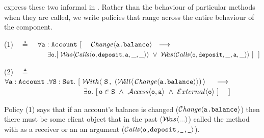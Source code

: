  express these two informal  %
in \Chainmail.  Rather than %
 the behaviour of particular methods when they are called, we
write policies 
{}  that range across the entire behaviour of the
component.
\vspace{.2cm}


(1)\ \  $\triangleq$\ \ $\forall \prg{a}:\prg{Account}\ [\ \ \ \  \Changes{\prg{a.balance}}  \ \    
    \longrightarrow \ \    \hfill$ \\
  $\strut \hspace{2.3cm} 
 \exists \prg{o}. [\  \Past{\Calls{\prg{o},\prg{deposit},\prg{a},\_,\_}}\ \vee\  \Past{\Calls{\prg{o},\prg{deposit},\_,\prg{a},\_}} \ ] \ \ ] \hfill $

\vspace{.4cm}

    (2)\ \  $\triangleq$\ \ $\forall \prg{a}:\prg{Account}\ .\forall \prg{S}:\prg{Set}.\ [  \ \Using{(\Future{\,\Changes{\prg{a.balance}}})\,}{\prg{S}\,}\ \ \   \
    \longrightarrow$ \\
 $\strut \hspace{3.9cm} \hfill \exists \prg{o}.\ [\, \prg{o}\in \prg{S}\ \wedge \ \CanAccess{\prg{o}}{\prg{a}}\ \wedge  \  \External{\prg{o}}  \ ] \ \ \ \ ]$

\vspace{.2cm}

{}
 
Policy (1) %
says that if   an account's balance is changed
($\Changes{\prg{a.balance}}$)
then there must be some client object \prg{o}
that in the past (${\Past{...}}$) called the  method with  as a receiver or an an argument ($\Calls{\prg{o,deposit,\_,\_}}$).
{}
{}

